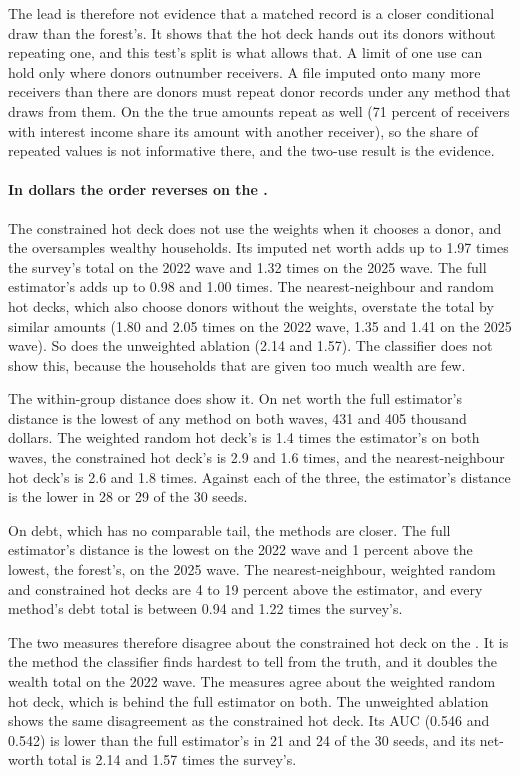 The lead is therefore not evidence that a matched record is a closer
conditional draw than the forest's. It shows that the hot deck hands out its
donors without repeating one, and this test's split is what allows that. A
limit of one use can hold only where donors outnumber receivers. A file
imputed onto many more receivers than there are donors must repeat donor
records under any method that draws from them. On the \cps{} the true
amounts repeat as well (71 percent of receivers with interest income share
its amount with another receiver), so the share of repeated values is not
informative there, and the two-use result is the evidence.

\paragraph{In dollars the order reverses on the \scf{}.} The constrained hot
deck does not use the weights when it chooses a donor, and the \scf{}
oversamples wealthy households. Its imputed net worth adds up to 1.97 times
the survey's total on the 2022 wave and 1.32 times on the 2025 wave. The
full estimator's adds up to 0.98 and 1.00 times. The nearest-neighbour and
random hot decks, which also choose donors without the weights, overstate
the total by similar amounts (1.80 and 2.05 times on the 2022 wave, 1.35 and
1.41 on the 2025 wave). So does the unweighted ablation (2.14 and 1.57). The
classifier does not show this, because the households that are given too
much wealth are few.

The within-group distance does show it. On net worth the full estimator's
distance is the lowest of any method on both waves, 431 and 405 thousand
dollars. The weighted random hot deck's is 1.4 times the estimator's on both
waves, the constrained hot deck's is 2.9 and 1.6 times, and the
nearest-neighbour hot deck's is 2.6 and 1.8 times. Against each of the
three, the estimator's distance is the lower in 28 or 29 of the 30 seeds.

On debt, which has no comparable tail, the methods are closer. The full
estimator's distance is the lowest on the 2022 wave and 1 percent above the
lowest, the \microimpute{} forest's, on the 2025 wave. The
nearest-neighbour, weighted random and constrained hot decks are 4 to 19
percent above the estimator, and every method's debt total is between 0.94
and 1.22 times the survey's.

The two measures therefore disagree about the constrained hot deck on the
\scf{}. It is the method the classifier finds hardest to tell from the
truth, and it doubles the wealth total on the 2022 wave. The measures agree
about the weighted random hot deck, which is behind the full estimator on
both. The unweighted ablation shows the same disagreement as the constrained
hot deck. Its AUC (0.546 and 0.542) is lower than the full estimator's in 21
and 24 of the 30 seeds, and its net-worth total is 2.14 and 1.57 times the
survey's.

